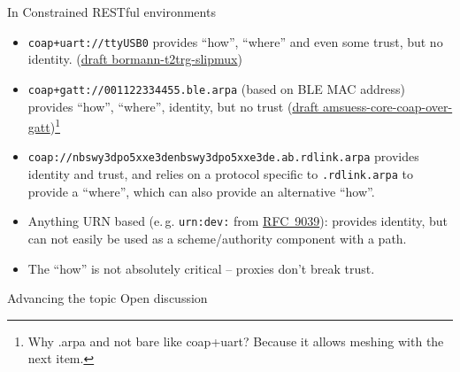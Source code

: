 \documentclass[aspectratio=169,colorlinks]{beamer}
\newcommand{\rfc}[1]{\href{https://datatracker.ietf.org/doc/html/rfc#1}{RFC~#1}}
\newcommand{\ietfdraft}[1]{\href{https://datatracker.ietf.org/doc/draft-#1/}{draft #1}}
\begin{document}
\begin{frame}{In Constrained RESTful environments}\large
  \begin{itemize}
    \item \texttt{coap+uart://ttyUSB0} provides ``how'', ``where'' and even some trust, but no identity. (\ietfdraft{bormann-t2trg-slipmux})
    \item \texttt{coap+gatt://001122334455.ble.arpa} (based on BLE MAC address) provides ``how'', ``where'', identity, but no trust (\ietfdraft{amsuess-core-coap-over-gatt})\footnote{Why .arpa and not bare like coap+uart? Because it allows meshing with the next item.}
    \item \texttt{coap://nbswy3dpo5xxe3denbswy3dpo5xxe3de.ab.rdlink.arpa} provides identity and trust, and relies on a protocol specific to \texttt{.rdlink.arpa} to provide a ``where'', which can also provide an alternative ``how''.
    \item Anything URN based (e.\,g. \texttt{urn:dev:} from \rfc{9039}): provides identity, but can not easily be used as a scheme/authority component with a path.
    \item The ``how'' is not absolutely critical -- proxies don't break trust.
  \end{itemize}
\end{frame}

\begin{frame}{Advancing the topic}\Large
  Open discussion
\end{frame}
\end{document}
